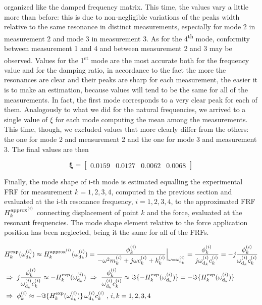 \documentclass[a4paper,12pt,oneside]{article}
\begin{document}
organized like the damped frequency matrix. This time, the values vary a little more than before: this is due to non-negligible variations of the peaks width relative to the same resonance in distinct measurements, especially for mode 2 in measurement 2 and mode 3 in measurement 3. As for the 4\textsuperscript{th} mode, conformity between measurement 1 and 4 and between measurement 2 and 3 may be observed. Values for the 1\textsuperscript{st} mode are the most accurate both for the frequency value and for the damping ratio, in accordance to the fact the more the resonances are %
clear and their peaks are sharp for each measurement, the easier it is to make an estimation, because values will tend to be the same for all of the measurements. In fact, the first mode corresponds to a very clear peak for each of them. Analogously to what we did for the natural frequencies, we arrived to a single value of $ \xi $ for each mode computing the mean among the measurements. This time, though, we excluded values that more clearly differ from the others: the one for mode 2 and measurement 2 and the one for mode 3 and measurement 3. The final values are then

\[
	\bm{\xi} =	\begin{bmatrix}
								0.0159 & 0.0127 & 0.0062 & 0.0068
							\end{bmatrix}
\]
	
Finally, the mode shape of i-th mode is estimated equalling the experimental FRF for measurement $ k = 1,2,3,4 $, computed in the previous section and evaluated at the i-th resonance frequency, $ i = 1,2,3,4 $, to the approximated FRF $ H^{\textup{approx}^{(i)}}_k $ connecting displacement of point $ k $ and the force, evaluated at the resonant frequencies. The mode shape element relative to the force application position has been neglected, being it the same for all of the FRFs.

\begin{equation} \begin{split}
\label{eqn:modal_matrix_elements}
	& H^{\textup{exp}}_k(\omega_{\textup{d}_k}^{(i)}) \approx
		H^{\textup{approx}^{(i)}}_k(\omega_{\textup{d}_k}^{(i)}) =
		\frac{\phi^{(i)}_k}
		{-\omega^2 m^{(i)}_k + j \omega c^{(i)}_k + k^{(i)}_k}
		\Big|_{\omega = \omega_{\textup{d}_k}^{(i)}} =
		\frac{\phi^{(i)}_k}{j \omega_{\textup{d}_k}^{(i)} c^{(i)}_k} =
		-j \frac{\phi^{(i)}_k}{\omega_{\textup{d}_k}^{(i)} c^{(i)}_k} \\
	& \Rightarrow ~
		j \frac{\phi^{(i)}_k}{\omega_{\textup{d}_k}^{(i)} c^{(i)}_k} \approx
		- H^{\textup{exp}}_k(\omega_{\textup{d}_k}^{(i)})	~ \Rightarrow ~
		\frac{\phi^{(i)}_k}{\omega_{\textup{d}_k}^{(i)} c^{(i)}_k} \approx
		\Im\{- H^{\textup{exp}}_k(\omega_{\textup{d}_k}^{(i)})\} =
		- \Im\{H^{\textup{exp}}_k(\omega_{\textup{d}_k}^{(i)})\} \\
	& \Rightarrow ~ \phi^{(i)}_k \approx
		- \Im\{H^{\textup{exp}}_k(\omega_{\textup{d}_k}^{(i)})\}
		\, \omega_{\textup{d}_k}^{(i)} c^{(i)}_k ~ \text{,} ~ i,k = 1,2,3,4
\end{split} \end{equation}
\end{document}
